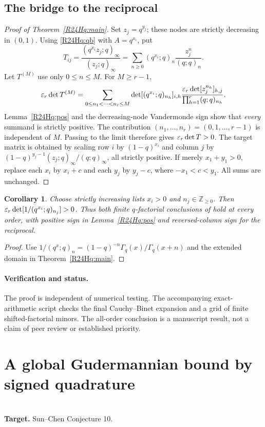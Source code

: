 \documentclass[11pt,a4paper]{article}
\newtheorem{SourceRceHqcorollary}[SourceRceHqtheorem]{Corollary}
\begin{document}
\subsection{The bridge to the reciprocal}\label{R24Hq:bridge}
\begin{proof}[Proof of Theorem~\ref{R24Hq:main}]
Set $z_j=q^{y_j}$; these nodes are strictly decreasing in $(0,1)$.
Using \eqref{R24Hq:qb} with $A=q^{x_i}$, put
\[
 T_{ij}=\frac{(q^{x_i}z_j;q)_\infty}{(z_j;q)_\infty}
       =\sum_{n\ge0}(q^{x_i};q)_n\frac{z_j^n}{(q;q)_n}.
\]
Let $T^{(M)}$ use only $0\le n\le M$. For $M\ge r-1$,
\[
 \varepsilon_r\det T^{(M)}
 =\sum_{0\le n_1<\cdots<n_r\le M}
  \det[(q^{x_i};q)_{n_h}]_{i,h}
  \frac{\varepsilon_r\det[z_j^{n_h}]_{h,j}}{\prod_{h=1}^r(q;q)_{n_h}} .
\]
Lemma~\ref{R24Hq:pos} and the decreasing-node Vandermonde sign show that
\emph{every} summand is strictly positive. The contribution
$(n_1,\ldots,n_r)=(0,1,\ldots,r-1)$ is independent of $M$. Passing to
the limit therefore gives $\varepsilon_r\det T>0$. The target matrix is obtained by
scaling row $i$ by $(1-q)^{x_i}$ and column $j$ by
$(1-q)^{y_j-1}(z_j;q)_\infty/(q;q)_\infty$, all strictly positive.
If merely $x_1+y_1>0$, replace each $x_i$ by $x_i+c$ and each $y_j$
by $y_j-c$, where $-x_1<c<y_1$. All sums are unchanged.
\end{proof}
\begin{SourceRceHqcorollary}
Choose strictly increasing lists $x_i>0$ and $n_j\in\mathbb Z_{\ge0}$. Then
$\varepsilon_r\det[1/(q^{x_i};q)_{n_j}]>0$. Thus both finite
$q$-factorial conclusions of \cite[Appendix A]{R24Hq:KVZ} hold at every order,
with positive sign in Lemma~\ref{R24Hq:pos} and reversed-column sign for the reciprocal.
\end{SourceRceHqcorollary}
\begin{proof}
Use $1/(q^x;q)_n=(1-q)^{-n}\Gamma_q(x)/\Gamma_q(x+n)$
and the extended domain in Theorem~\ref{R24Hq:main}.
\end{proof}
\paragraph{Verification and status.}
The proof is independent of numerical testing. The accompanying exact-arithmetic script checks the final Cauchy--Binet expansion
and a grid of finite shifted-factorial minors. The all-order conclusion is a manuscript result, not
a claim of peer review or established priority.
\endgroup


\clearpage

\section{A global Gudermannian bound by signed quadrature}
\label{section:R25M}
\\[3pt]
\noindent\textbf{Target.} Sun--Chen Conjecture 10.
\end{document}
